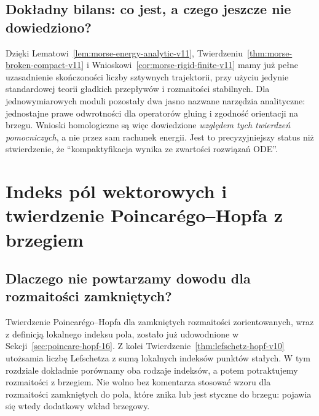 \documentclass[11pt,a4paper,oneside]{report}
\theoremstyle{plain}
\theoremstyle{definition}
\theoremstyle{remark}
\begin{document}
\section{Dokładny bilans: co jest, a czego jeszcze nie dowiedziono?}
Dzięki Lematowi~\ref{lem:morse-energy-analytic-v11},
Twierdzeniu~\ref{thm:morse-broken-compact-v11} i
Wnioskowi~\ref{cor:morse-rigid-finite-v11} mamy już
pełne uzasadnienie skończoności liczby sztywnych trajektorii,
przy użyciu jedynie standardowej teorii gładkich przepływów
i rozmaitości stabilnych. Dla jednowymiarowych moduli
pozostały dwa jasno nazwane narzędzia analityczne:
jednostajne prawe odwrotności dla operatorów gluing i
zgodność orientacji na brzegu. Wnioski homologiczne są
więc dowiedzione \emph{względem tych twierdzeń pomocniczych},
a nie przez sam rachunek energii. Jest to precyzyjniejszy
status niż stwierdzenie, że ``kompaktyfikacja wynika
ze zwartości rozwiązań ODE''.


\chapter{Indeks pól wektorowych i twierdzenie Poincarégo--Hopfa z brzegiem}
\label{ch:poincare-hopf-v11}

\section{Dlaczego nie powtarzamy dowodu dla rozmaitości zamkniętych?}
Twierdzenie Poincarégo--Hopfa dla zamkniętych rozmaitości
zorientowanych, wraz z definicją lokalnego indeksu pola,
zostało już udowodnione w
Sekcji~\ref{sec:poincare-hopf-16}.
Z kolei Twierdzenie~\ref{thm:lefschetz-hopf-v10} utożsamia
liczbę Lefschetza z sumą lokalnych indeksów punktów stałych.
W tym rozdziale dokładnie porównamy oba rodzaje indeksów,
a potem potraktujemy rozmaitości z brzegiem.
Nie wolno bez komentarza stosować wzoru dla rozmaitości zamkniętych
do pola, które znika lub jest styczne do brzegu: pojawia się wtedy
dodatkowy wkład brzegowy.
\end{document}
